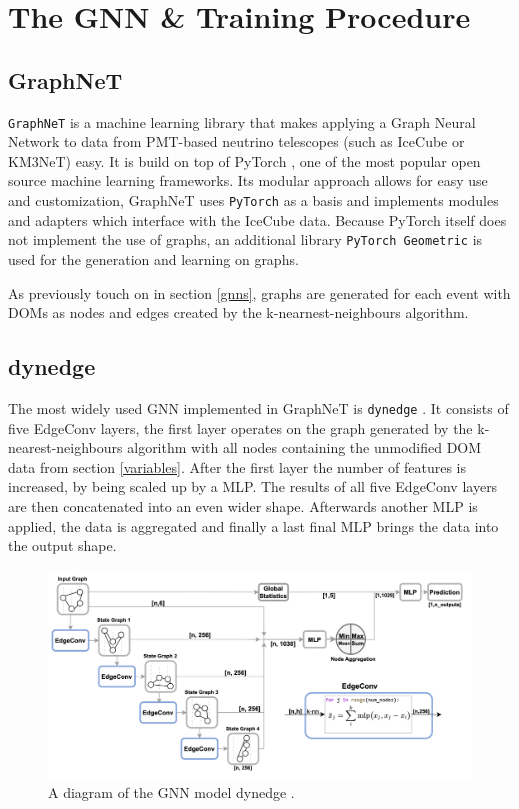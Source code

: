 \documentclass[a4paper,10pt]{scrartcl}
\begin{document}
\section{The GNN \& Training Procedure}

\subsection{GraphNeT}
\label{graphnet}

\texttt{GraphNeT} \cite{graphnet} is a machine learning library that makes applying a Graph Neural Network to data from PMT-based neutrino telescopes (such as IceCube or KM3NeT) easy.
It is build on top of PyTorch \cite{torch}, one of the most popular open source machine learning frameworks.
Its modular approach allows for easy use and customization, GraphNeT uses \texttt{PyTorch} as a basis and implements modules and adapters which interface with the IceCube data.
Because PyTorch itself does not implement the use of graphs, an additional library \texttt{PyTorch Geometric} \cite{torch-geometric} is used for the generation and learning on graphs.

As previously touch on in section \ref{gnns}, graphs are generated for each event with DOMs as nodes and edges created by the k-nearnest-neighbours algorithm.

\subsection{dynedge}

The most widely used GNN implemented in GraphNeT is \texttt{dynedge} \cite{2209.03042}.
It consists of five EdgeConv layers, the first layer operates on the graph generated by the k-nearest-neighbours algorithm with all nodes containing the unmodified DOM data from section \ref{variables}.
After the first layer the number of features is increased, by being scaled up by a MLP.
The results of all five EdgeConv layers are then concatenated into an even wider shape.
Afterwards another MLP is applied, the data is aggregated and finally a last final MLP brings the data into the output shape.

\begin{figure}[h]
    \includegraphics[width=\textwidth]{images/dynedge.png}
    \centering
    \caption{A diagram of the GNN model dynedge \cite{2209.03042}.}
    \label{fig:dynedge}
\end{figure}
\end{document}
